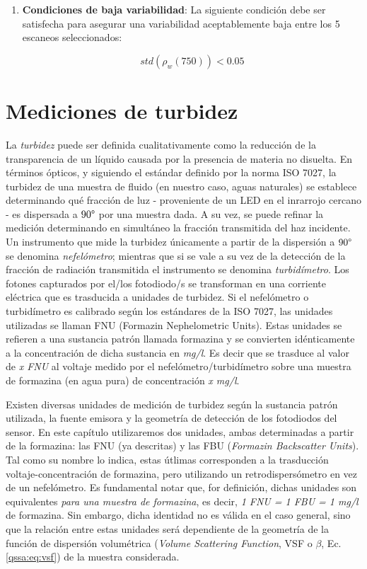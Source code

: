 \begin{enumerate}
                
                \item \textbf{Condiciones de baja variabilidad}: La siguiente condición debe ser satisfecha para asegurar una variabilidad aceptablemente baja entre los 5 escaneos seleccionados:
                
                \begin{equation}
                    std(\rho_{w}(750)) < 0.05
                \end{equation}
            \end{enumerate}
            
\section{Mediciones de turbidez}
\label{dat:s:turbidez}

    La \textit{turbidez} puede ser definida cualitativamente como la reducción de la transparencia de un líquido causada por la presencia de materia no disuelta.
    En términos ópticos, y siguiendo el estándar definido por la norma ISO 7027, la turbidez de una muestra de fluido (en nuestro caso, aguas naturales) se establece determinando qué fracción de luz - proveniente de un LED en el inrarrojo cercano - es dispersada a $90\degree$ por una muestra dada. A su vez, se puede refinar la medición determinando en simultáneo la fracción transmitida del haz incidente. Un instrumento que mide la turbidez únicamente a partir de la dispersión a $90\degree$ se denomina \textit{nefelómetro}; mientras que si se vale a su vez de la detección de la fracción de radiación transmitida el instrumento se denomina \textit{turbidímetro}. Los fotones capturados por el/los fotodiodo/s se transforman en una corriente eléctrica que es trasducida a unidades de turbidez. Si el nefelómetro o turbidímetro es calibrado según los estándares de la ISO 7027, las unidades utilizadas se llaman FNU (Formazin Nephelometric Units). Estas unidades se refieren a una sustancia patrón llamada formazina y se convierten idénticamente a la concentración de dicha sustancia en \textit{mg/l}. Es decir que se trasduce al valor de \textit{x FNU} al voltaje medido por el nefelómetro/turbidímetro sobre una muestra de formazina (en agua pura) de concentración \textit{x mg/l}.
    
    Existen diversas unidades de medición de turbidez según la sustancia patrón utilizada, la fuente emisora y la geometría de detección de los fotodiodos del sensor. En este capítulo utilizaremos dos unidades, ambas determinadas a partir de la formazina: las FNU (ya descritas) y las FBU (\textit{Formazin Backscatter Units}). Tal como su nombre lo indica, estas útlimas corresponden a la trasducción voltaje-concentración de formazina, pero utilizando un retrodispersómetro en vez de un nefelómetro. Es fundamental notar que, for definición, dichas unidades son equivalentes \textit{para una muestra de formazina}, es decir, \textit{1 FNU = 1 FBU = 1 mg/l} de formazina. Sin embargo, dicha identidad no es válida en el caso general, sino que la relación entre estas unidades será dependiente de la geometría de la función de dispersión volumétrica (\textit{Volume Scattering Function}, VSF o $\beta$, Ec. \ref{qssa:eq:vsf}) de la muestra considerada.
    
